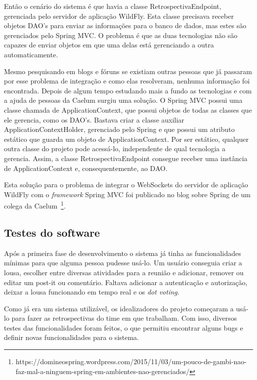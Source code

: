 Então o cenário do sistema é que havia a classe RetrospectivaEndpoint, gerenciada pelo servidor de aplicação WildFly. Esta classe precisava receber objetos DAO's para enviar as informações para o banco de dados, mas estes são gerenciados pelo Spring MVC. O problema é que as duas tecnologias não são capazes de enviar objetos em que uma delas está gerenciando a outra automaticamente.

Mesmo pesquisando em blogs e fóruns se existiam outras pessoas que já passaram por esse problema de integração e como elas resolveram, nenhuma informação foi encontrada. Depois de algum tempo estudando mais a fundo as tecnologias e com a ajuda de pessoas da Caelum surgiu uma solução. O Spring MVC possui uma classe chamada de ApplicationContext, que possui objetos de todas as classes que ele gerencia, como os DAO's. Bastava criar a classe auxiliar ApplicationContextHolder, gerenciado pelo Spring e que possui um atributo estático que guarda um objeto de ApplicationContext. Por ser estático, qualquer outra classe do projeto pode acessá-lo, independente de qual tecnologia a gerencia. Assim, a classe RetrospectivaEndpoint consegue receber uma instância de ApplicationContext e, consequentemente, ao DAO.

Esta solução para o problema de integrar o WebSockets do servidor de aplicação WildFly com o \textit{framework} Spring MVC foi publicado no blog sobre Spring de um colega da Caelum~\footnote{https://domineospring.wordpress.com/2015/11/03/um-pouco-de-gambi-nao-faz-mal-a-ninguem-spring-em-ambientes-nao-gerenciados/}. 

\subsection{Testes do software}

Após a primeira fase de desenvolvimento o sistema já tinha as funcionalidades mínimas para que alguma pessoa pudesse usá-lo. Um usuário conseguia criar a lousa, escolher entre diversas atividades para a reunião e adicionar, remover ou editar um post-it ou comentário. Faltava adicionar a autenticação e autorização, deixar a lousa funcionando em tempo real e os \textit{dot voting}.

Como já era um sistema utilizável, os idealizadores do projeto começaram a usá-lo para fazer as retrospectivas do time em que trabalham. Com isso, diversos testes das funcionalidades foram feitos, o que permitiu encontrar alguns bugs e definir novas funcionalidades para o sistema.

